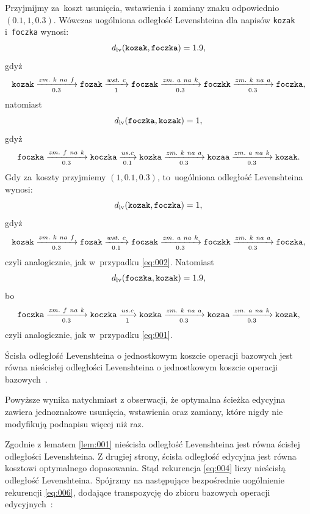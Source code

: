 \documentclass{praca1}
\begin{document}
\begin{example}
Przyjmijmy za~koszt usunięcia, wstawienia i zamiany znaku odpowiednio $(0.1, 1, 0.3)$. Wówczas uogólniona odległość Levenshteina dla napisów \verb|kozak| i~\verb|foczka| wynosi:
\begin{equation}
\label{eq:001}
d_{\mathrm{lv}}(\verb|kozak|, \verb|foczka|) = 1.9,
\end{equation}
gdyż
$$
\verb|kozak|  \xrightarrow[0.3]{zm.\ k\ na\ f} \verb|fozak| \xrightarrow[1]{wst.\ c} \verb|foczak| \xrightarrow[0.3]{zm.\ a\ na\ k} \verb|foczkk| \xrightarrow[0.3]{zm.\ k\ na\ a} \verb|foczka|,
$$
natomiast
\begin{equation}\label{eq:002}
d_{\mathrm{lv}}(\verb|foczka|, \verb|kozak|) = 1,
\end{equation}
gdyż
$$
\verb|foczka|  \xrightarrow[0.3]{zm.\ f\ na\ k} \verb|koczka|  \xrightarrow[0.1]{us. c} \verb|kozka| \xrightarrow[0.3]{zm.\ k\ na\ a} \verb|kozaa| \xrightarrow[0.3]{zm.\ a\ na\ k} \verb|kozak|.
$$
Gdy za~koszty przyjmiemy $(1, 0.1, 0.3)$, to~uogólniona odległość Levenshteina wynosi:
$$
d_{\mathrm{lv}}(\verb|kozak|, \verb|foczka|) = 1,
$$
gdyż
$$
\verb|kozak|  \xrightarrow[0.3]{zm.\ k\ na\ f} \verb|fozak| \xrightarrow[0.1]{wst.\ c} \verb|foczak| \xrightarrow[0.3]{zm.\ a\ na\ k} \verb|foczkk| \xrightarrow[0.3]{zm.\ k\ na\ a} \verb|foczka|,
$$
czyli analogicznie, jak w~przypadku \eqref{eq:002}. Natomiast
$$
d_{\mathrm{lv}}(\verb|foczka|, \verb|kozak|) = 1.9,
$$
bo
$$
\verb|foczka|  \xrightarrow[0.3]{zm.\ f\ na\ k} \verb|koczka|  \xrightarrow[1]{us. c} \verb|kozka| \xrightarrow[0.3]{zm.\ k\ na\ a} \verb|kozaa| \xrightarrow[0.3]{zm.\ a\ na\ k} \verb|kozak|,
$$
czyli analogicznie, jak w~przypadku \eqref{eq:001}.
\end{example}


\begin{lemma}
\label{lem:001}
Ścisła odległość Levenshteina o jednostkowym koszcie operacji bazowych jest równa nieścisłej odległości Levenshteina o jednostkowym koszcie operacji bazowych~\cite{Boytsov2011:indexingmethods}.
\end{lemma}

Powyższe wynika natychmiast z obserwacji, że optymalna ścieżka edycyjna zawiera jednoznakowe usunięcia, wstawienia oraz zamiany, które nigdy nie modyfikują podnapisu więcej niż raz.


Zgodnie z lematem \ref{lem:001} nieścisła odległość Levenshteina jest równa ścisłej odległości Levenshteina. Z drugiej strony, ścisła odległość edycyjna jest równa kosztowi optymalnego dopasowania. Stąd rekurencja \eqref{eq:004} liczy nieścisłą odległość Levenshteina. Spójrzmy na następujące bezpośrednie uogólnienie rekurencji \eqref{eq:006}, dodające transpozycję do zbioru bazowych operacji edycyjnych~\cite{Boytsov2011:indexingmethods}:
\end{document}
